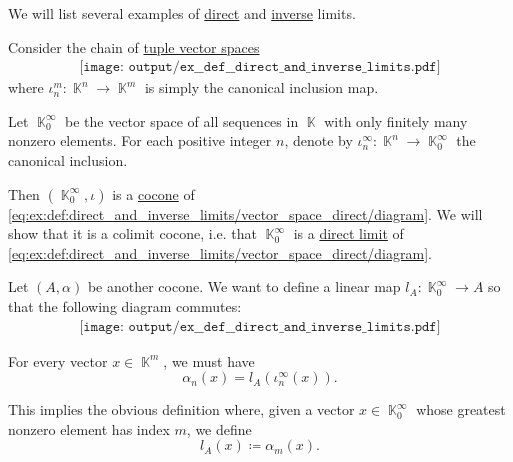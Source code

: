 \begin{example}\label{ex:def:direct_and_inverse_limits}
  We will list several examples of \hyperref[def:direct_and_inverse_limits/direct]{direct} and \hyperref[def:direct_and_inverse_limits/inverse]{inverse} limits.

  \begin{thmenum}
     Consider the chain of \hyperref[def:module_of_tuples]{tuple vector spaces}
    \begin{equation}\label{eq:ex:def:direct_and_inverse_limits/vector_space_direct/diagram}
      \begin{aligned}
        \texttt{[image: output/ex\_\_def\_\_direct\_and\_inverse\_limits.pdf]}
      \end{aligned}
    \end{equation}
    where \( \iota_n^m: \BbbK^n \to \BbbK^m \) is simply the canonical inclusion map.

    Let \( \BbbK_0^\infty \) be the vector space of all sequences in \( \BbbK \) with only finitely many nonzero elements. For each positive integer \( n \), denote by \( \iota_n^\infty: \BbbK^n \to \BbbK_0^\infty \) the canonical inclusion.

    Then \( (\BbbK_0^\infty, \iota) \) is a \hyperref[def:category_of_cones/cocone]{cocone} of \eqref{eq:ex:def:direct_and_inverse_limits/vector_space_direct/diagram}. We will show that it is a colimit cocone, i.e. that \( \BbbK_0^\infty \) is a \hyperref[def:direct_and_inverse_limits]{direct limit} of \eqref{eq:ex:def:direct_and_inverse_limits/vector_space_direct/diagram}.

    Let \( (A, \alpha) \) be another cocone. We want to define a linear map \( l_A: \BbbK_0^\infty \to A \) so that the following diagram commutes:
    \begin{equation}\label{eq:ex:def:direct_and_inverse_limits/vector_space_direct/limit}
      \begin{aligned}
        \texttt{[image: output/ex\_\_def\_\_direct\_and\_inverse\_limits.pdf]}
      \end{aligned}
    \end{equation}

    For every vector \( x \in \BbbK^m \), we must have
    \begin{equation*}
      \alpha_n(x) = l_A(\iota_n^\infty(x)).
    \end{equation*}

    This implies the obvious definition where, given a vector \( x \in \BbbK_0^\infty \) whose greatest nonzero element has index \( m \), we define
    \begin{equation*}
      l_A(x) \coloneqq \alpha_m(x).
    \end{equation*}


\end{thmenum}
\end{example}
